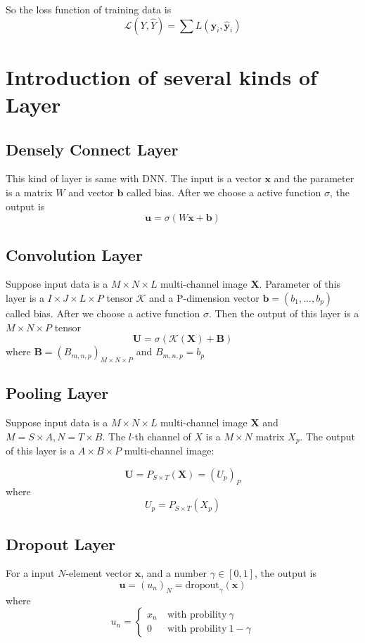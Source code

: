 	So the loss function of training data is 
	\begin{equation}
	\mathcal L(Y,\hat Y) = \sum L(\mathbf y_i,\hat {\mathbf {y}}_i)
	\end{equation}
	
 	\section{Introduction of several kinds of Layer}
	\subsection{Densely Connect Layer}\label{Dense}
	This kind of layer is same with DNN. The input is a vector $\mathbf x$ and the parameter is a matrix $W$ and vector $\mathbf b$ called bias. After we choose a active function $\sigma$, the output is
	\begin{equation}
	\mathbf u = \sigma(W \mathbf x + \mathbf b)
	\end{equation}
	\subsection{Convolution Layer}\label{Convolution}
	Suppose input data is a $M \times N \times L $ multi-channel image $\mathbf X$. Parameter of this layer is a $I\times J\times L\times P$ tensor $\mathcal K$ and a P-dimension vector $\mathbf b = (b_1,...,b_p)$ called bias. After we choose a active function $\sigma$. Then the output of this layer is a $M\times N \times P$ tensor  
	$$
		\mathbf U = \sigma(\mathcal{K}(\mathbf X) + \mathbf B)
	$$
	where $\mathbf B =(B_{m,n,p})_{M\times N\times P}$ and $B_{m,n,p} = b_p$ 
	\subsection{Pooling Layer}\label{Pooling}
	Suppose input data is a $M \times N \times L $ multi-channel image $\mathbf X$ and $M=S\times A, N=T\times B$. The $l$-th channel of $X$ is a $M\times N$ matrix $X_p$. The output of this layer is a $A\times B\times P$ multi-channel image:
	
	$$
	\mathbf U =P_{S\times T}(\mathbf X)=(U_p)_{P}
	$$
	where 
	\begin{equation}
	U_p = P_{S\times T}(X_p)
	\end{equation}
	\subsection{Dropout Layer}\label{Dropout}
	For a input $N$-element vector $\mathbf x$, and a number $\gamma \in [0,1]$, the output is 
	$$
	\mathbf u = (u_n)_N = \text{dropout}_{\gamma} (\mathbf x)
	$$
	where 
	\begin{equation}
	u_n = \left \{ 
	\begin{split}
	x_n &\ \text{with probility}\ \gamma\\
	0   &\ \text{with probility}\ 1-\gamma
	\end{split}
	\right.
	\end{equation}
